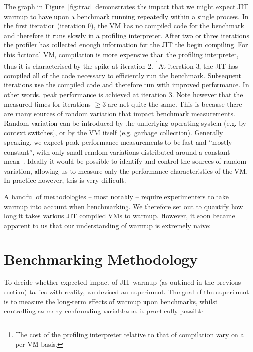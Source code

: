\documentclass[10pt,preprint]{sigplanconf}
\begin{document}
The graph in Figure~\ref{fig:trad} demonstrates the impact that we might
expect JIT warmup to have upon a benchmark running repeatedly within a
single process. In the first iteration (iteration 0), the VM has no compiled
code for the benchmark and therefore it runs slowly in a profiling
interpreter. After two or three iterations the profiler has collected enough
information for the JIT the begin compiling. For this fictional VM,
compilation is more expensive than the profiling interpreter, thus it is
characterised by the spike at iteration 2. \footnote{The cost of
the profiling interpreter relative to that of compilation vary on a per-VM
basis.}At iteration 3, the JIT has compiled all of the code necessary to
efficiently run the benchmark. Subsequent iterations use the compiled code
and therefore run with improved performance. In other words, peak
performance is achieved at iteration 3. Note however that the measured times
for iterations $\geq 3$ are not quite the same. This is because there are many
sources of random variation that impact benchmark measurements. Random
variation can be introduced by the underlying operating system (e.g. by
context switches), or by the VM itself (e.g. garbage collection).  Generally
speaking, we expect peak performance measurements to be fast and ``mostly
constant'', with only small random variations distributed around a constant
mean~\cite{XXX}.  Ideally it would be possible to identify and control the
sources of random variation, allowing us to measure only the performance
characteristics of the VM. In practice however, this is very difficult.

A handful of methodologies -- most notably
\cite{kalibera12quantifying,kalibera13rigorous} -- require experimenters to take
warmup into account when benchmarking. We therefore set out to quantify how long
it takes various JIT compiled VMs to warmup. However, it soon became apparent to
us that our understanding of warmup is extremely naive:


\section{Benchmarking Methodology}
\label{sec:methodology}

To decide whether expected impact of JIT warmup (as outlined in the previous
section) tallies with reality, we devised an experiment.  The goal of the
experiment is to measure the long-term effects of warmup upon benchmarks,
whilst controlling as many confounding variables as is practically
possible.
\end{document}
